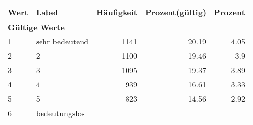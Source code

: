      \begin{longtable}{lXrrr}
     \toprule
     \textbf{Wert} & \textbf{Label} & \textbf{Häufigkeit} & \textbf{Prozent(gültig)} & \textbf{Prozent} \\
     \endhead
     \midrule
     \multicolumn{5}{l}{\textbf{Gültige Werte}}\\

     1 &
     \multicolumn{1}{X}{ sehr bedeutend   } &


       \num{1141} &
       \num[round-mode=places,round-precision=2]{20,19} &
         \num[round-mode=places,round-precision=2]{4,05} \\

     2 &
     \multicolumn{1}{X}{ 2   } &


       \num{1100} &
       \num[round-mode=places,round-precision=2]{19,46} &
         \num[round-mode=places,round-precision=2]{3,9} \\

     3 &
     \multicolumn{1}{X}{ 3   } &


       \num{1095} &
       \num[round-mode=places,round-precision=2]{19,37} &
         \num[round-mode=places,round-precision=2]{3,89} \\

     4 &
     \multicolumn{1}{X}{ 4   } &


       \num{939} &
       \num[round-mode=places,round-precision=2]{16,61} &
         \num[round-mode=places,round-precision=2]{3,33} \\

     5 &
     \multicolumn{1}{X}{ 5   } &


       \num{823} &
       \num[round-mode=places,round-precision=2]{14,56} &
         \num[round-mode=places,round-precision=2]{2,92} \\

     6 &
     \multicolumn{1}{X}{ bedeutungslos   } &



\end{longtable}

